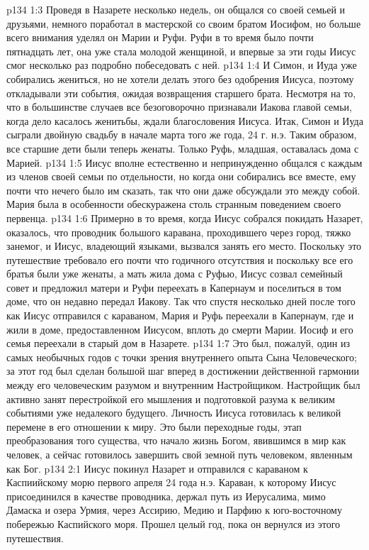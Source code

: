 \vs p134 1:3 Проведя в Назарете несколько недель, он общался со своей семьей и друзьями, немного поработал в мастерской со своим братом Иосифом, но больше всего внимания уделял он Марии и Руфи. Руфи в то время было почти пятнадцать лет, она уже стала молодой женщиной, и впервые за эти годы Иисус смог несколько раз подробно побеседовать с ней.
\vs p134 1:4 И Симон, и Иуда уже собирались жениться, но не хотели делать этого без одобрения Иисуса, поэтому откладывали эти события, ожидая возвращения старшего брата. Несмотря на то, что в большинстве случаев все безоговорочно признавали Иакова главой семьи, когда дело касалось женитьбы, ждали благословения Иисуса. Итак, Симон и Иуда сыграли двойную свадьбу в начале марта того же года, 24 г. н.э. Таким образом, все старшие дети были теперь женаты. Только Руфь, младшая, оставалась дома с Марией.
\vs p134 1:5 Иисус вполне естественно и непринужденно общался с каждым из членов своей семьи по отдельности, но когда они собирались все вместе, ему почти что нечего было им сказать, так что они даже обсуждали это между собой. Мария была в особенности обескуражена столь странным поведением своего первенца.
\vs p134 1:6 Примерно в то время, когда Иисус собрался покидать Назарет, оказалось, что проводник большого каравана, проходившего через город, тяжко занемог, и Иисус, владеющий языками, вызвался занять его место. Поскольку это путешествие требовало его почти что годичного отсутствия и поскольку все его братья были уже женаты, а мать жила дома с Руфью, Иисус созвал семейный совет и предложил матери и Руфи переехать в Капернаум и поселиться в том доме, что он недавно передал Иакову. Так что спустя несколько дней после того как Иисус отправился с караваном, Мария и Руфь переехали в Капернаум, где и жили в доме, предоставленном Иисусом, вплоть до смерти Марии. Иосиф и его семья переехали в старый дом в Назарете.
\vs p134 1:7 Это был, пожалуй, один из самых необычных годов с точки зрения внутреннего опыта Сына Человеческого; за этот год был сделан большой шаг вперед в достижении действенной гармонии между его человеческим разумом и внутренним Настройщиком. Настройщик был активно занят перестройкой его мышления и подготовкой разума к великим событиями уже недалекого будущего. Личность Иисуса готовилась к великой перемене в его отношении к миру. Это были переходные годы, этап преобразования того существа, что начало жизнь Богом, явившимся в мир как человек, а сейчас готовилось завершить свой земной путь человеком, явленным как Бог.
\vs p134 2:1 Иисус покинул Назарет и отправился с караваном к Каспиийскому морю первого апреля 24 года н.э. Караван, к которому Иисус присоединился в качестве проводника, держал путь из Иерусалима, мимо Дамаска и озера Урмия, через Ассирию, Медию и Парфию к юго\hyp{}восточному побережью Каспийского моря. Прошел целый год, пока он вернулся из этого путешествия.
